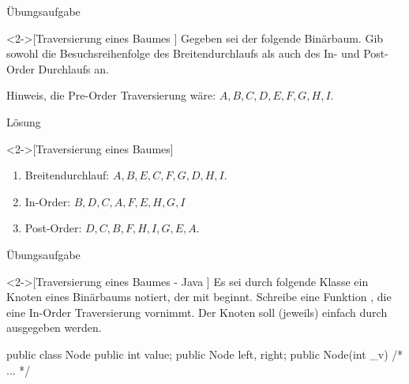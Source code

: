 \begin{frame}[c]{Übungsaufgabe}
    \begin{exercise}<2->[Traversierung eines Baumes ]
        Gegeben sei der folgende Binärbaum. Gib sowohl die Besuchsreihenfolge des Breitendurchlaufs als auch des In- und Post-Order Durchlaufs an.\pause{}
        \begin{center}
        \end{center}
        \pause{}Hinweis, die Pre-Order Traversierung wäre: \(A,B,C,D,E,F,G,H,I\).
    \end{exercise}
\end{frame}

\begin{frame}[c]{Lösung}
    \begin{solve}<2->[Traversierung eines Baumes]
        \begin{center}
        \end{center}
        \begin{enumerate}[<+(1)->]
            \item Breitendurchlauf:\pause{} \(A,B,E,C,F,G,D,H,I\).
            \item In-Order:\pause{} \(B,D,C,A,F,E,H,G,I\)
            \item Post-Order:\pause{} \(D,C,B,F,H,I,G,E,A\).
        \end{enumerate}
    \end{solve}
\end{frame}

\begin{frame}[fragile,c]{Übungsaufgabe}
    \begin{exercise}<2->[Traversierung eines Baumes - Java ]
        Es sei durch folgende Klasse ein Knoten eines Binärbaums notiert, der mit  beginnt.\pause{} Schreibe eine Funktion , die eine In-Order Traversierung vornimmt.\pause{} Der Knoten soll (jeweils) einfach durch  ausgegeben werden.\pause{}
\begin{plainjava}
public class Node {
    public int value;
    public Node left, right;
    public Node(int _v) {
        /* ... */
    }
}
\end{plainjava}
    \end{exercise}
\end{frame}

